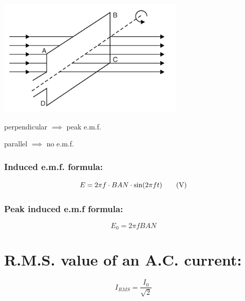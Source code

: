 \documentclass[11pt]{article}
\begin{document}
\begin{center}
	\includegraphics[width=0.5\linewidth]{"pictures/coi"}
\end{center} 

\begin{multicols}{2}
	\begin{center}
		perpendicular $\implies$ peak e.m.f.
	\end{center}
	\begin{center}
		parallel $\implies$ no e.m.f.
	\end{center}
\end{multicols}

\subsubsection{Induced e.m.f. formula: }
\begin{equation}
	E=2\pi f\cdot BAN \cdot\sin(2\pi f t)\tag{\si{\volt}}
\end{equation}

\subsubsection{Peak induced e.m.f formula: }
\begin{equation}
	E_0 = 2\pi fBAN\tag{\si\volt}
\end{equation}
\section{R.M.S. value of an A.C. current: }
\begin{equation}
	I_{RMS} = \frac{I_0}{\sqrt2}
\end{equation}
\end{document}

